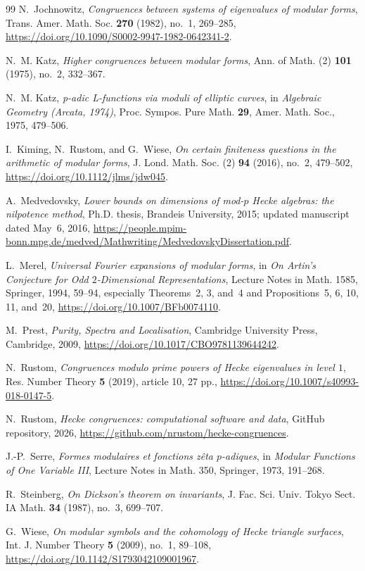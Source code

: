 \documentclass[11pt]{article}
\theoremstyle{plain}
\theoremstyle{definition}
\theoremstyle{remark}
\numberwithin{equation}{section}
\begin{document}
\begin{thebibliography}{99}
N.~Jochnowitz,
\emph{Congruences between systems of eigenvalues of modular forms},
Trans. Amer. Math. Soc. \textbf{270} (1982), no.~1, 269--285,
\url{https://doi.org/10.1090/S0002-9947-1982-0642341-2}.

N.~M. Katz,
\emph{Higher congruences between modular forms},
Ann. of Math. (2) \textbf{101} (1975), no.~2, 332--367.

N.~M. Katz,
\emph{p-adic L-functions via moduli of elliptic curves},
in \emph{Algebraic Geometry (Arcata, 1974)},
Proc. Sympos. Pure Math. \textbf{29}, Amer. Math. Soc., 1975, 479--506.

I.~Kiming, N.~Rustom, and G.~Wiese,
\emph{On certain finiteness questions in the arithmetic of modular forms},
J. Lond. Math. Soc. (2) \textbf{94} (2016), no.~2, 479--502,
\url{https://doi.org/10.1112/jlms/jdw045}.

A.~Medvedovsky,
\emph{Lower bounds on dimensions of mod-\(p\) Hecke algebras:
the nilpotence method},
Ph.D. thesis, Brandeis University, 2015; updated manuscript dated
May~6, 2016,
\url{https://people.mpim-bonn.mpg.de/medved/Mathwriting/MedvedovskyDissertation.pdf}.

L.~Merel,
\emph{Universal Fourier expansions of modular forms},
in \emph{On Artin's Conjecture for Odd \(2\)-Dimensional
Representations}, Lecture Notes in Math. 1585, Springer, 1994, 59--94,
especially Theorems~2, 3, and~4 and Propositions~5, 6, 10, 11, and~20,
\url{https://doi.org/10.1007/BFb0074110}.

M.~Prest,
\emph{Purity, Spectra and Localisation},
Cambridge University Press, Cambridge, 2009,
\url{https://doi.org/10.1017/CBO9781139644242}.

N.~Rustom,
\emph{Congruences modulo prime powers of Hecke eigenvalues in level \(1\)},
Res. Number Theory \textbf{5} (2019), article 10, 27 pp.,
\url{https://doi.org/10.1007/s40993-018-0147-5}.

N.~Rustom,
\emph{Hecke congruences: computational software and data},
GitHub repository, 2026,
\url{https://github.com/nrustom/hecke-congruences}.

J.-P.~Serre,
\emph{Formes modulaires et fonctions z\^eta \(p\)-adiques},
in \emph{Modular Functions of One Variable III},
Lecture Notes in Math. 350, Springer, 1973, 191--268.

R.~Steinberg,
\emph{On Dickson's theorem on invariants},
J. Fac. Sci. Univ. Tokyo Sect. IA Math. \textbf{34} (1987), no.~3,
699--707.

G.~Wiese,
\emph{On modular symbols and the cohomology of Hecke triangle surfaces},
Int. J. Number Theory \textbf{5} (2009), no.~1, 89--108,
\url{https://doi.org/10.1142/S1793042109001967}.

\end{thebibliography}
\end{document}
